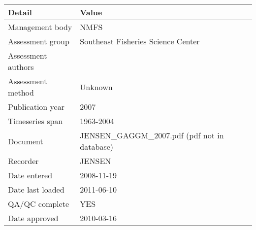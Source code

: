 \begin{table}[htb]
\centering
\begin{tabular}{lp{7cm}}
\toprule
Detail & Value \\
\midrule
Management body    & NMFS                                          \\
Assessment group   & Southeast Fisheries Science Center            \\
Assessment authors &                                               \\
Assessment method  & Unknown                                       \\
Publication year   & 2007                                          \\
Timeseries span    & 1963-2004                                     \\
Document           & JENSEN\_GAGGM\_2007.pdf (pdf not in database) \\
Recorder           & JENSEN                                        \\
Date entered       & 2008-11-19                                    \\
Date last loaded   & 2011-06-10                                    \\
QA/QC complete     & YES                                           \\
Date approved      & 2010-03-16                                    \\
\bottomrule
\end{tabular}
\label{tab:assessdet}
\end{table}
